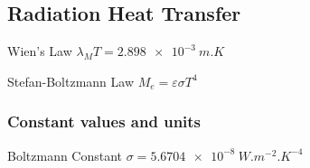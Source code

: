 \documentclass[10pt]{article}
\begin{document}
\begin{multicols}{3}
\subsection{Radiation Heat Transfer}
\begin{ttdesc}[labelwidth=\widthof{\ttfamily{letterpaper/a4paper}}]
\item[Wien's Law] $\lambda_M T = \SI{2.898e-3}{m.K}$
\item[Stefan-Boltzmann Law] $M_e = \varepsilon \sigma T^4$
\end{ttdesc}


\subsubsection{Constant values and units}
\begin{ttdesc}[labelwidth=\widthof{\ttfamily{letterpaper/a4paper}}]
\item[Boltzmann Constant] $\sigma = \SI{5.6704e-8}{W.m^{-2}.K^{-4}}$ 
\end{ttdesc}


\end{multicols}
\end{document}

